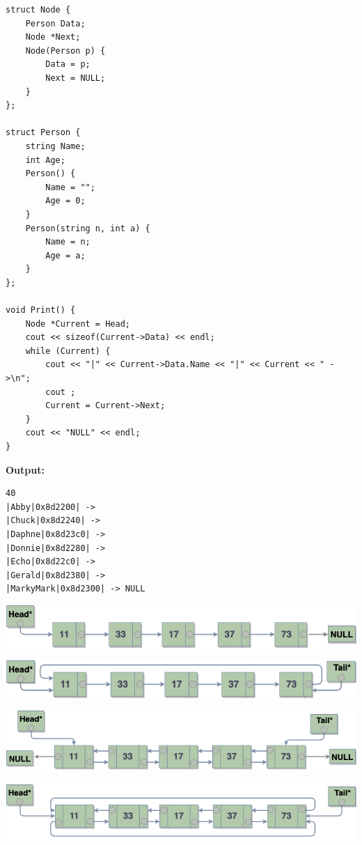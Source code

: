 \begin{verbatim}
struct Node {
    Person Data;
    Node *Next;
    Node(Person p) {
        Data = p;
        Next = NULL;
    }
};

struct Person {
    string Name;
    int Age;
    Person() {
        Name = "";
        Age = 0;
    }
    Person(string n, int a) {
        Name = n;
        Age = a;
    }
};

void Print() {
    Node *Current = Head;
    cout << sizeof(Current->Data) << endl;
    while (Current) {
        cout << "|" << Current->Data.Name << "|" << Current << " ->\n";
        cout ;
        Current = Current->Next;
    }
    cout << "NULL" << endl;
}
\end{verbatim}

\textbf{Output:}

\begin{verbatim}
40
|Abby|0x8d2200| -> 
|Chuck|0x8d2240| -> 
|Daphne|0x8d23c0| -> 
|Donnie|0x8d2280| -> 
|Echo|0x8d22c0| -> 
|Gerald|0x8d2380| -> 
|MarkyMark|0x8d2300| -> NULL
\end{verbatim}


\begin{center}
\includegraphics[scale=.40]{images/singly_linked_list.png}
\end{center}

\begin{center}
\includegraphics[scale=.40]{images/singly_linked_list_circular.png}
\end{center}



\begin{center}
\includegraphics[scale=.40]{images/doubly_linked_list.png}
\end{center}



\begin{center}
\includegraphics[scale=.40]{images/linked_list_double_circular.png}
\end{center}

